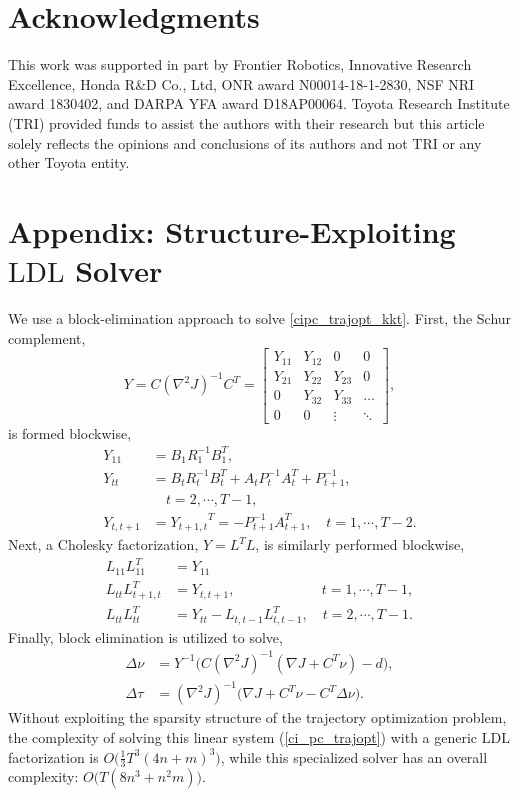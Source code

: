 \section*{Acknowledgments}
This work was supported in part by Frontier Robotics, Innovative Research Excellence, Honda R\&D Co., Ltd, ONR award N00014-18-1-2830, NSF NRI award 1830402, and DARPA YFA award D18AP00064. Toyota Research Institute (TRI) provided funds to assist the authors with their research but this article solely reflects the opinions and conclusions of its authors and not TRI or any other Toyota entity. 

\section{Appendix: Structure-Exploiting $\mbox{LDL}$ Solver}
We use a block-elimination approach \cite{wang2009fast} to solve \eqref{cipc_trajopt_kkt}. First, the Schur complement,
\begin{equation}
	Y = C (\nabla^2 J)^{-1} C^T = \begin{bmatrix} Y_{11} & Y_{12} & 0 & 0 \\ 
		Y_{21} & Y_{22} & Y_{23} & 0 \\ 
		0 & Y_{32} & Y_{33} & \hdots \\
		0 & 0 & \vdots & \ddots \end{bmatrix},
\end{equation}
is formed blockwise,
\begin{align}
	Y_{11} &= B_1 R_1^{-1} B_1^T, \\
	Y_{tt} &= B_t R_t^{-1} B_t^T + A_t P_t^{-1} A_t^T + P_{t+1}^{-1}, \\
	&\quad t = 2, \cdots, T-1, \nonumber\\
	Y_{t,t+1} &= {Y_{t+1,t}}^T = -P_{t+1}^{-1} A_{t+1}^T, \quad t = 1, \cdots, T-2.
\end{align}
Next, a Cholesky factorization, $Y = L^T L$, is similarly performed blockwise,
\begin{align}
	L_{11} L_{11}^T &= Y_{11} \\
	L_{tt} L_{t+1,t}^T &= Y_{t, t+1}, \, \quad \quad \quad \quad \quad \quad t = 1, \cdots, T-1, \\
	L_{tt} L_{tt}^T &= Y_{tt} - L_{t,t-1} L_{t,t-1}^T, \quad t = 2, \cdots, T-1.
\end{align}
Finally, block elimination is utilized to solve, 
\begin{align}
	\Delta \nu &= Y^{-1} \Big(C (\nabla^2 J)^{-1} (\nabla J + C^T \nu) - d \Big), \\
	\Delta \tau &= (\nabla^2 J)^{-1} \Big(\nabla J + C^T \nu  - C^T \Delta \nu \Big).
\end{align}
Without exploiting the sparsity structure of the trajectory optimization problem, the complexity of solving this linear system (\ref{ci_pc_trajopt}) with a generic $\mbox{LDL}$ factorization is $O \Big(\frac{1}{3}T^3 (4n + m)^3 \Big)$, while this specialized solver has an overall complexity: $O \Big(T(8n^3 + n^2 m) \Big)$.